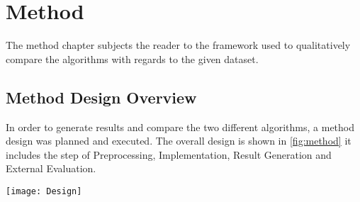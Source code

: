 \documentclass[../report.tex]{subfiles}
\begin{document}
 \chapter{Method} The method chapter subjects the reader to the framework used to qualitatively compare the algorithms with regards to the given dataset.

\section{Method Design Overview}
In order to generate results and compare the two different algorithms, a method design was planned and executed. The overall design is shown in \ref{fig:method} it includes the step of Preprocessing, Implementation, Result Generation and External Evaluation.


\begin{center}
  \texttt{[image: Design]}
\end{center}

\end{document}
